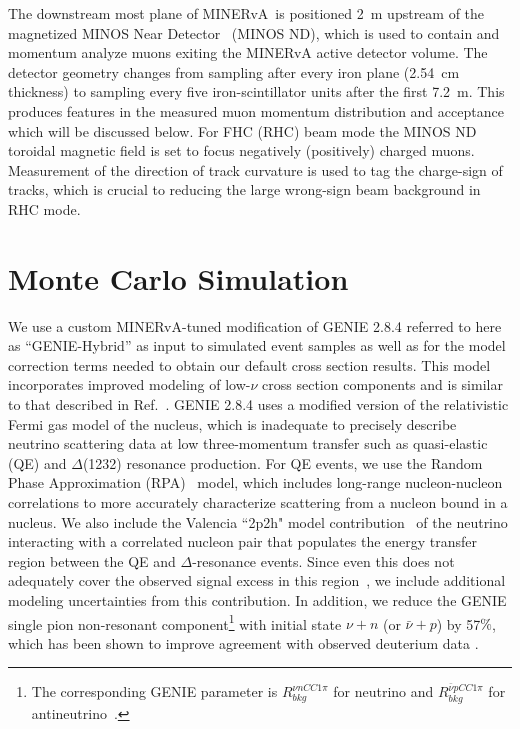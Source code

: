 \documentclass[aps,preprint,showpacs,superscriptaddress,linenumbers,nofootinbib,prd,12pt]{revtex4}
\newcommand{\minerva}{MINERvA\xspace}
\begin{document}
The downstream most plane of \minerva\ is positioned 2~m 
upstream of the magnetized MINOS Near Detector~\cite{Michael:2008bc} (MINOS ND), 
which is used to contain and momentum analyze muons exiting
the \minerva active detector volume.
The detector geometry changes from sampling after every iron plane (2.54~cm thickness) to sampling every five iron-scintillator units after the first 7.2~m. This produces features in the measured muon momentum distribution and acceptance which will be discussed below.
For FHC (RHC) beam mode the MINOS ND toroidal magnetic field 
is set to focus negatively (positively) charged muons.
Measurement of the direction of track curvature is used to tag the charge-sign of tracks, which  
is crucial to reducing the large wrong-sign beam background in RHC mode.

\section{Monte Carlo Simulation}
\label{sec:xsec}

We use a custom \minerva-tuned modification of GENIE 2.8.4 \cite{Andreopoulos:2009rq, Andreopoulos:2015wxa} referred to here as ``GENIE-Hybrid''
as input to simulated event samples as well as for the model correction terms needed to obtain our
default cross section results. This model incorporates improved modeling of low-$\nu$ cross section components
and is similar to that described in Ref.~\cite{Rodrigues:2015hik}. 
GENIE 2.8.4 uses a modified version of the relativistic Fermi gas model of the nucleus, which is inadequate to precisely describe  
neutrino scattering data at low three-momentum transfer such as quasi-elastic (QE) and $\Delta$(1232) 
resonance production. For QE events, we use the Random Phase Approximation (RPA)~\cite{Nieves:2004wx} model, which includes long-range nucleon-nucleon correlations 
to more accurately characterize scattering from a nucleon bound in a nucleus.
We also include the Valencia ``2p2h" model contribution~\cite{Nieves:2011pp} of the neutrino 
interacting with a correlated nucleon pair that populates the energy transfer
region between the QE and $\Delta$-resonance events.
Since even this does not adequately cover the observed signal excess in this region~\cite{Rodrigues:2015hik}, we include additional modeling uncertainties from this contribution. 
In addition, we reduce the GENIE single pion 
non-resonant component\footnote{The corresponding GENIE parameter is $R_{bkg}^{\nu n CC 1 \pi}$ for neutrino and $R_{bkg}^{\bar{\nu} p CC 1 \pi}$ for antineutrino~\cite{Andreopoulos:2015wxa}.} with initial state $\nu+n$ (or $\bar{\nu}+p$)
by 57$\%$, which has been shown to improve agreement with observed deuterium data \cite{Rodrigues:2016xjj}.
\end{document}
